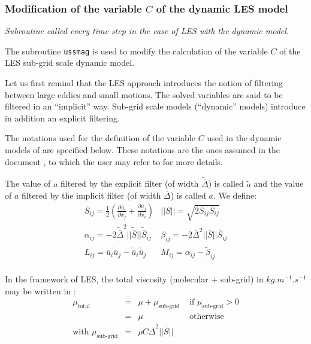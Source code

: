 {{{%
\subsubsection{Modification of the variable $C$ of the dynamic LES model}

\noindent
\textit{Subroutine called every time step in the case of LES with the
dynamic model.}

The subroutine \texttt{ussmag} is used to modify the calculation of the variable $C$ of
the LES sub-grid scale dynamic model.

Let us first remind that the LES approach introduces the notion of
filtering between large eddies and small motions. The solved variables
are said to be filtered in an ``implicit'' way. Sub-grid scale models
(``dynamic'' models) introduce in addition an explicit filtering.

The notations used for the definition of the variable $C$ used in the
dynamic models of \CS are specified below. These notations are the ones
assumed in the document \cite{benhamadouche01}, to which the user may
refer to for more details.

The value of $a$ filtered by the explicit filter (of width
$\widetilde{\overline{\Delta}}$) is called $\widetilde{a}$ and the value
of $a$ filtered by the implicit filter (of width $\overline{\Delta}$) is
called $\overline{a}$.
We define:
\begin{equation}
\begin{array}{ll}
\overline{S}_{ij}=\frac{1}{2}(\frac{\partial \overline{u}_i}{\partial x_j}
                  +\frac{\partial \overline{u}_j}{\partial x_i})  &
||\overline{S}||=\sqrt{2 \overline{S}_{ij}\overline{S}_{ij}}\\
\alpha_{ij}=-2\widetilde{\overline{\Delta}}^2
             ||\widetilde{\overline{S}}||
             \widetilde{\overline{S}}_{ij}&
\beta_{ij}=-2\overline{\Delta}^2
             ||\overline{S}||
               \overline{S}_{ij}\\
L_{ij}=\widetilde{\overline{u}_i\overline{u}_j}-
 \widetilde{\overline{u}}_i\widetilde{\overline{u}}_j&
M_{ij}=\alpha_{ij}-\widetilde{\beta}_{ij}\\
\end{array}
\end{equation}


In the framework of LES, the total viscosity (molecular + sub-grid) in
$kg.m^{-1}.s^{-1}$ may be written in \CS:
\begin{equation}
\begin{array}{llll}
\mu_{\text{total}}&=&\mu+\mu_{\text{sub-grid}} &
    \text{\ \ if\ \ }\mu_{\text{sub-grid}}>0\\
                   &=&\mu                          &
    \text{\ \ otherwise }\\
\text{with\ }\mu_{\text{sub-grid}}&=&\rho C \overline{\Delta}^2 ||\overline{S}||
\end{array}
\end{equation}

}}}
